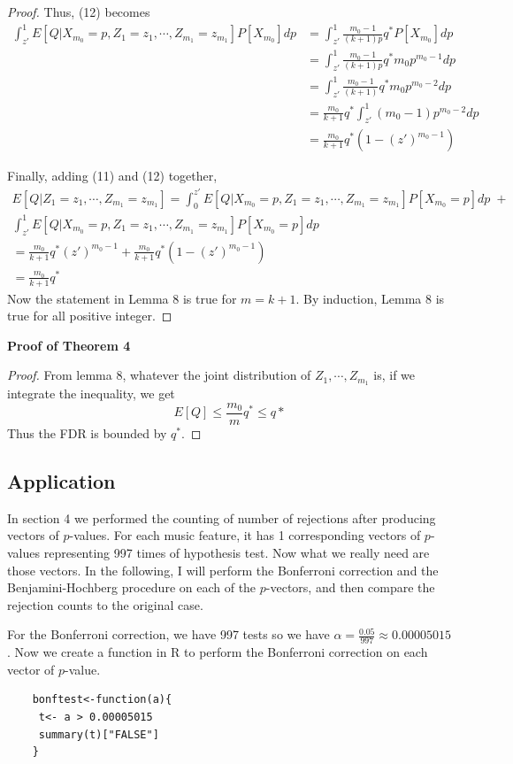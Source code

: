 \documentclass[12pt]{article}
\theoremstyle{plain}
\theoremstyle{definition}
\theoremstyle{remark}
\begin{document}
\begin{proof}
Thus, (12) becomes
\begin{align*}
\int_{z'}^1E[Q|X_{m_0}=p,Z_1=z_1,\cdots,Z_{m_1}=z_{m_1}]P[X_{m_0}]dp 
&= \int_{z'}^1 \frac{m_0-1}{(k+1)p}q^*P[X_{m_0}]dp\\
&=\int_{z'}^1 \frac{m_0-1}{(k+1)p}q^*m_0p^{m_0-1}dp\\
&=\int_{z'}^1 \frac{m_0-1}{(k+1)}q^*m_0p^{m_0-2}dp\\
&=\frac{m_0}{k+1}q^*\int_{z'}^1(m_0-1)p^{m_0-2}dp\\
&=\frac{m_0}{k+1}q^*(1-(z')^{m_0-1})
\end{align*}

Finally, adding (11) and (12) together,
\begin{gather*}
    E[Q|Z_1=z_1,\cdots,Z_{m_1}=z_{m_1}]=\int_0^{z'}E[Q|X_{m_0}=p,Z_1=z_1,\cdots,Z_{m_1}=z_{m_1}]P[X_{m_0}=p]dp\;+\\\int_{z'}^1E[Q|X_{m_0}=p,Z_1=z_1,\cdots,Z_{m_1}=z_{m_1}]P[X_{m_0}=p]dp\\ 
    =\frac{m_0}{k+1}q^*(z')^{m_0-1}+\frac{m_0}{k+1}q^*(1-(z')^{m_0-1})\\
    =\frac{m_0}{k+1}q^*
\end{gather*}
Now the statement in Lemma 8 is true for $m=k+1$. By induction, Lemma 8 is true for all positive integer.
\end{proof}


\textbf{Proof of Theorem 4}
\begin{proof} \cite{5.3}\cite{5.7}
From lemma 8, whatever the joint distribution of $Z_1,\cdots,Z_{m_1}$ is,  if we integrate the inequality, we get
\[E[Q]\leq\frac{m_0}{m}q^*\leq q*
\]
Thus the FDR is bounded by $q^*$.
\end{proof}

\newpage
\subsection{Application}
In section 4 we performed the counting of number of rejections after producing vectors of $p$-values. For each music feature, it has 1 corresponding vectors of $p$-values representing 997 times of hypothesis test. Now what we really need are those vectors. In the following, I will perform the Bonferroni correction and the Benjamini-Hochberg procedure on each of the $p$-vectors, and then compare the rejection counts to the original case.

For the Bonferroni correction, we have 997 tests so we have $\alpha=\frac{0.05}{997}\approx 0.00005015$. Now we create a function in R to perform the Bonferroni correction on each vector of $p$-value.
\begin{verbatim}
    bonftest<-function(a){
     t<- a > 0.00005015
     summary(t)["FALSE"]
    }
\end{verbatim}
\end{document}
